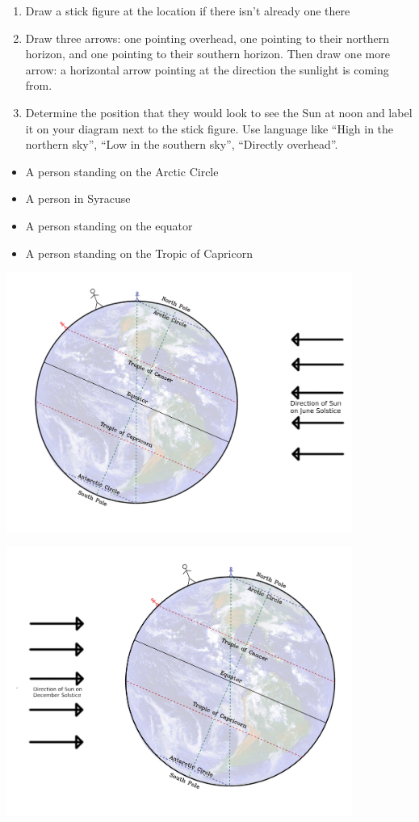 \documentclass[12pt]{article}
\begin{document}
\begin{enumerate}
	\item Draw a stick figure at the location if there isn't already one there
	
	\item Draw three arrows: one pointing overhead, one pointing to their northern horizon, and one pointing to their southern horizon. Then draw one more arrow: a horizontal arrow pointing at the direction the sunlight is coming from.
	
	\item Determine the position that they would look to see the Sun at noon and label it on your diagram next to the stick figure. Use language like ``High in the northern sky'', ``Low in the southern sky'', ``Directly overhead''.
\end{enumerate}

\begin{itemize}
	\item A person standing on the Arctic Circle
	\item A person in Syracuse
	\item A person standing on the equator
	\item A person standing on the Tropic of Capricorn
\end{itemize}

\includegraphics[width=0.85\textwidth]{earth-diagram-june.png}

\includegraphics[width=0.85\textwidth]{earth-diagram-december.png}
\end{document}
